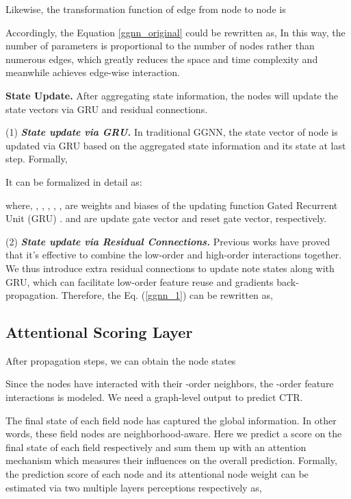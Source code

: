 \documentclass[sigconf]{acmart}
\begin{document}
Likewise, the transformation function of edge  from node  to node  is

Accordingly, the Equation \ref{ggnn_original} could be rewritten as, 
In this way, the number of parameters is proportional to the number of nodes rather than numerous edges, which greatly reduces the space and time complexity and meanwhile achieves edge-wise interaction.

\noindent \textbf{State Update.}
After aggregating state information, the nodes will update the state vectors via GRU and residual connections.

(1) \textit{\textbf{State update via GRU.}}
In traditional GGNN, the state vector of node  is updated via GRU based on the aggregated state information  and its state at last step.
Formally, 

It can be formalized in detail as:

where, , , , , ,  are weights and biases of the updating function Gated Recurrent Unit (GRU) \cite{li2015gated}. 
 and  are update gate vector and reset gate vector, respectively.


(2) \textit{\textbf{State update via Residual Connections.}}
Previous works \cite{shan2016deep,song2018autoint,cheng2016wide} have proved that it's effective to combine the low-order and high-order interactions together.
We thus introduce extra residual connections to update note states along with GRU, which can facilitate low-order feature reuse and gradients back-propagation.
Therefore, the Eq. (\ref{ggnn_1}) can be rewritten as, 




\subsection{Attentional Scoring Layer}
After  propagation steps, we can obtain the node states
\begin{center}

\end{center}
Since the nodes have interacted with their -order neighbors, the -order feature interactions is modeled.
We need a graph-level output to predict CTR.

The final state of each field node has captured the global information. In other words, these field nodes are neighborhood-aware. 
Here we predict a score on the final state of each field respectively and sum them up with an attention mechanism which measures their influences on the overall prediction.
Formally, the prediction score of each node  and its attentional node weight can be estimated via two multiple layers perceptions respectively as,
\end{document}
